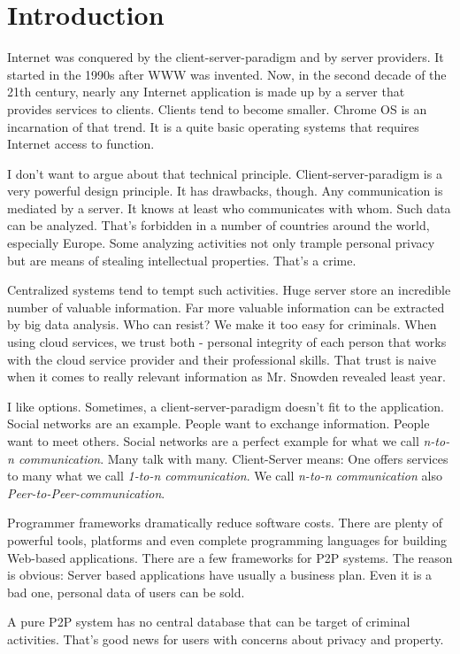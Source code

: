 \chapter{Introduction}
Internet was conquered by the client-server-paradigm and by server providers. It started in the 1990s after WWW was invented. Now, in the second decade of the 21th century, nearly any Internet application is made up by a server that provides services to clients. Clients tend to become smaller. Chrome OS is an incarnation of that trend. It is a quite basic operating systems that requires Internet access to function.

I don't want to argue about that technical principle. Client-server-paradigm is a very powerful design principle. It has drawbacks, though. Any communication is mediated by a server. It knows at least who communicates with whom. Such data can be analyzed. That's forbidden in a number of countries around the world, especially Europe. Some analyzing activities not only trample personal privacy but are means of stealing intellectual properties. That's a crime.

Centralized systems tend to tempt such activities. Huge server store an incredible number of valuable information. Far more valuable information can be extracted by big data analysis. Who can resist? We make it too easy for criminals. When using cloud services, we trust both - personal integrity of each person that works with the cloud service provider and their professional skills. That trust is naive when it comes to really relevant information as Mr. Snowden revealed least year.

I like options. Sometimes, a client-server-paradigm doesn't fit to the application. Social networks are an example. People want to exchange information. People want to meet others. Social networks are a perfect example for what we call {\it n-to-n communication}. Many talk with many. Client-Server means: One offers services to many what we call {\it 1-to-n communication}.
We call {\it n-to-n communication} also {\it Peer-to-Peer-communication}.

Programmer frameworks dramatically reduce software costs. There are plenty of powerful tools, platforms and even complete programming languages for building Web-based applications. There are a few frameworks for P2P systems. The reason is obvious: Server based applications have usually a business plan. Even it is a bad one, personal data of users can be sold. 

A pure P2P system has no central database that can be target of criminal activities. That's good news for users with concerns about privacy and property. 

